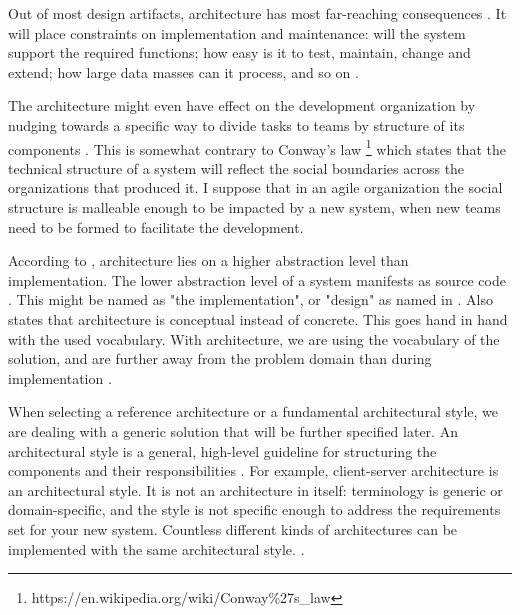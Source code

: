 \documentclass[utf8,english]{gradu3}
\begin{document}
Out of most design artifacts, architecture has most far-reaching consequences
\parencite[31]{Bass1998}. It will place constraints on implementation and
maintenance: will the system support the required functions;
how easy is it to test, maintain, change and extend; how large data masses can
it process, and so on \parencite{Koskimies2005}.

The architecture might even have effect on the development organization by
nudging towards a specific way to divide tasks to teams by structure of its
components \parencite[31]{Bass1998}. This is somewhat contrary to Conway's law
\footnote{https://en.wikipedia.org/wiki/Conway\%27s\_law} which states that the
technical structure of a system will reflect the social boundaries across the
organizations that produced it. I suppose that in an agile organization the
social structure is malleable enough to be impacted by a new system, when new
teams need to be formed to facilitate the development.

According to \textcite{Koskimies2005}, architecture lies on a higher
abstraction level than implementation. The lower abstraction level of a system
manifests as source code \parencite[24]{Bass1998}. This might be named as "the
implementation", or "design" as named in \textcite{IEEE12207}. Also \textcite[4]{IEEE42010} states
that architecture is conceptual instead of concrete. This goes hand in hand with
the used vocabulary. With architecture, we are using the vocabulary of the
solution, and are further away from the problem domain than during
implementation \parencite{Koskimies2005}.

When selecting a reference architecture or a fundamental
architectural style, we are dealing with a generic solution that will be further
specified later. An architectural style is a general, high-level guideline for
structuring the components and their responsibilities \parencite[24]{Bass1998}. For
example, client-server architecture is an architectural style. It is not an
architecture in itself: terminology is generic or domain-specific, and the style
is not specific enough to address the requirements set for your new system.
Countless different kinds of architectures can be implemented with the same
architectural style. \parencite[24]{Bass1998}.
\end{document}
